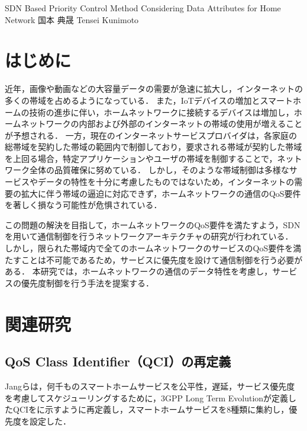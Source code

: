 \documentclass[a4paper,10pt,twocolumn,uplatex]{jsarticle}
\date{11}
\begin{document}
{SDN Based Priority Control Method Considering Data Attributes for Home Network}
{国本 典晟}
{Tensei Kunimoto}

\section{はじめに}
近年，画像や動画などの大容量データの需要が急速に拡大し，インターネットの多くの帯域を占めるようになっている．
また，IoTデバイスの増加とスマートホームの技術の進歩に伴い，ホームネットワークに接続するデバイスは増加し，ホームネットワークの内部および外部のインターネットの帯域の使用が増えることが予想される．
一方，現在のインターネットサービスプロバイダは，各家庭の総帯域を契約した帯域の範囲内で制御しており，要求される帯域が契約した帯域を上回る場合，特定アプリケーションやユーザの帯域を制御することで，ネットワーク全体の品質確保に努めている．
しかし，そのような帯域制御は多様なサービスやデータの特性を十分に考慮したものではないため，インターネットの需要の拡大に伴う帯域の逼迫に対応できず，ホームネットワークの通信のQoS要件を著しく損なう可能性が危惧されている．\par
この問題の解決を目指して，ホームネットワークのQoS要件を満たすよう，SDNを用いて通信制御を行うネットワークアーキテクチャの研究が行われている．
しかし，限られた帯域内で全てのホームネットワークのサービスのQoS要件を満たすことは不可能であるため，サービスに優先度を設けて通信制御を行う必要がある．
本研究では，ホームネットワークの通信のデータ特性を考慮し，サービスの優先度制御を行う手法を提案する．\par

\section{関連研究}

\subsection{QoS Class Identifier（QCI）の再定義}
Jangらは，何千ものスマートホームサービスを公平性，遅延，サービス優先度を考慮してスケジューリングするために，3GPP Long Term Evolutionが定義したQCIをに示すように再定義し，スマートホームサービスを8種類に集約し，優先度を設定した\cite{framework}．\par
\end{document}
